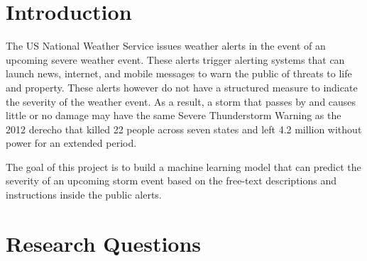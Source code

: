 \documentclass{article}
\begin{document}
 



\section{Introduction}
\label{introduction}
The US National Weather Service issues weather alerts in the event of an upcoming severe weather event. These alerts trigger alerting systems that can launch news, internet, and mobile messages to warn the public of threats to life and property. These alerts however do not have a structured measure to indicate the severity of the weather event. As a result, a storm that passes by and causes little or no damage may have the same Severe Thunderstorm Warning as the 2012 derecho that killed 22 people across seven states and left 4.2 million without power for an extended period.

The goal of this project is to build a machine learning model that can predict the severity of an upcoming storm event based on the free-text descriptions and instructions inside the public alerts. 

\section{Research Questions} 
\label{researchquestions}
\end{document}
